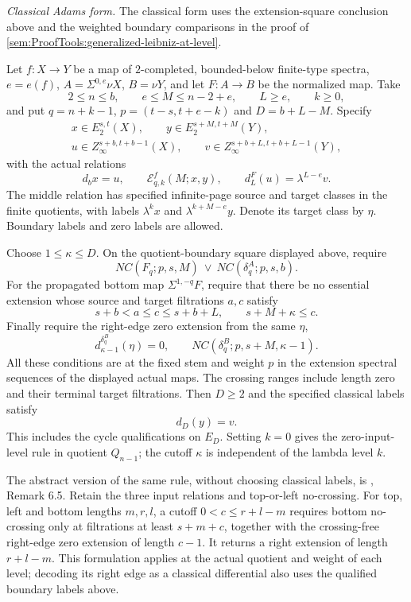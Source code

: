 \begin{proposition}
\textit{Classical Adams form.}
The classical form uses the extension-square conclusion above and the
weighted boundary comparisons in the proof of
\ref{sem:ProofTools:generalized-leibniz-at-level}.

Let $f:X\to Y$ be a map of $2$-completed, bounded-below finite-type spectra, $e=e(f)$,
$A=\Sigma^{0,e}\nu X$, $B=\nu Y$, and let $F:A\to B$ be the
normalized map. Take
\[
2\le n\le b,\qquad e\le M\le n-2+e,\qquad L\ge e,\qquad k\ge0,
\]
and put $q=n+k-1$, $p=(t-s,t+e-k)$ and $D=b+L-M$.
Specify
\[
\begin{gathered}
x\in E_2^{s,t}(X),\qquad y\in E_2^{s+M,t+M}(Y),\\
u\in Z_\infty^{s+b,t+b-1}(X),\qquad
v\in Z_\infty^{s+b+L,t+b+L-1}(Y),
\end{gathered}
\]
with the actual relations
\[
d_bx=u,\qquad
\mathcal E^f_{q,k}(M;x,y),\qquad
d_L^F(u)=\lambda^{L-e}v.
\]
The middle relation has specified infinite-page source and target
classes in the finite quotients, with labels
$\lambda^kx$ and $\lambda^{k+M-e}y$. Denote its target class by
$\eta$. Boundary labels and zero labels are allowed.

Choose $1\le\kappa\le D$. On the quotient-boundary square
displayed above, require
\[
NC(F_q;p,s,M)\ \lor\ NC(\delta_q^A;p,s,b).
\]
For the propagated bottom map $\Sigma^{1,-q}F$, require that there
be no essential extension whose source and target filtrations
$a,c$ satisfy
\[
s+b<a\le c\le s+b+L,\qquad s+M+\kappa\le c.
\]
Finally require the right-edge zero extension from the same $\eta$,
\[
d_{\kappa-1}^{\delta_q^B}(\eta)=0,\qquad
NC(\delta_q^B;p,s+M,\kappa-1).
\]
All these conditions are at the fixed stem and weight $p$ in the
extension spectral sequences of the displayed actual maps. The
crossing ranges include length zero and their terminal target
filtrations. Then $D\ge2$ and the specified classical labels satisfy
\[
d_D(y)=v.
\]
This includes the cycle qualifications on $E_D$.
Setting $k=0$ gives the zero-input-level rule in quotient $Q_{n-1}$;
the cutoff $\kappa$ is independent of the lambda level $k$.

The abstract version of the same rule, without choosing classical labels,
is \cite{LWX126}, Remark 6.5. Retain the three input relations and
top-or-left no-crossing. For top, left and bottom lengths $m,r,l$,
a cutoff $0<c\le r+l-m$ requires bottom no-crossing only at filtrations
at least $s+m+c$, together with the crossing-free right-edge zero
extension of length $c-1$. It returns a right extension of length
$r+l-m$. This formulation applies at the actual quotient and weight of
each level; decoding its right edge as a classical differential also
uses the qualified boundary labels above.
\end{proposition}
